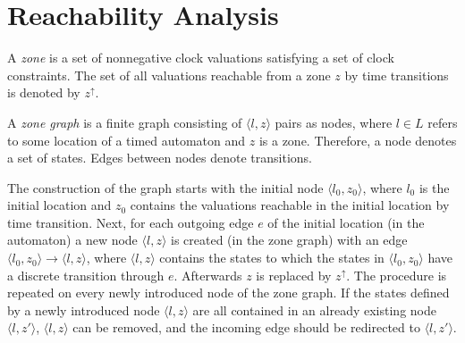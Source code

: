 \section{Reachability Analysis} \label{sec:reach}  

A \emph{zone} is a set of nonnegative clock valuations satisfying a set of clock constraints.
The set of all valuations reachable from a zone $z$ by time transitions is denoted by $z^\uparrow$.

A \emph{zone graph} is a finite graph consisting of $\langle l,z \rangle$ pairs as nodes, where $l \in L$ refers to some
location of a timed automaton and $z$ is a zone. Therefore, a node denotes a set
of states. Edges between nodes denote transitions. 

The construction of the graph starts with the initial node  $\langle l_0,z_0 \rangle$,
where $l_0$ is the initial location and $z_0$ contains the valuations reachable in the initial location by time transition. 
Next, for each outgoing edge $e$ of the initial location (in the automaton) a new node  $\langle l,z \rangle$ is created (in the zone graph) with an edge
$\langle l_0,z_0 \rangle \to \langle l,z \rangle$, where $\langle l,z \rangle$ contains the states to which the states in $\langle l_0,z_0 \rangle$ have a discrete transition through $e$. Afterwards $z$ is replaced by $z^\uparrow$.  The procedure is repeated on every newly introduced node of the zone graph. If the states defined by a newly introduced node $\langle l,z \rangle$ are all contained in an already existing node $\langle l,z' \rangle$, $\langle l,z \rangle$ can be removed, and the incoming edge should be redirected to $\langle l,z' \rangle$.

